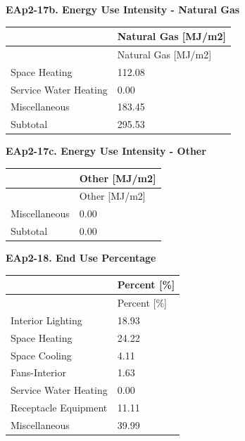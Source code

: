 \textbf{EAp2-17b. Energy Use Intensity - Natural Gas}

\begin{longtable}[c]{@{}ll@{}}
\toprule
 & Natural Gas [MJ/m2] \tabularnewline
\midrule
\endfirsthead

\toprule
 & Natural Gas [MJ/m2] \tabularnewline
\midrule
\endhead

Space Heating & 112.08 \tabularnewline
Service Water Heating & 0.00 \tabularnewline
Miscellaneous & 183.45 \tabularnewline
Subtotal & 295.53 \tabularnewline
\bottomrule
\end{longtable}

\textbf{EAp2-17c. Energy Use Intensity - Other}

\begin{longtable}[c]{@{}ll@{}}
\toprule
 & Other [MJ/m2] \tabularnewline
\midrule
\endfirsthead

\toprule
 & Other [MJ/m2] \tabularnewline
\midrule
\endhead

Miscellaneous & 0.00 \tabularnewline
Subtotal & 0.00 \tabularnewline
\bottomrule
\end{longtable}

\textbf{EAp2-18. End Use Percentage}

\begin{longtable}[c]{@{}ll@{}}
\toprule
 & Percent [\%] \tabularnewline
\midrule
\endfirsthead

\toprule
 & Percent [\%] \tabularnewline
\midrule
\endhead

Interior Lighting & 18.93 \tabularnewline
Space Heating & 24.22 \tabularnewline
Space Cooling & 4.11 \tabularnewline
Fans-Interior & 1.63 \tabularnewline
Service Water Heating & 0.00 \tabularnewline
Receptacle Equipment & 11.11 \tabularnewline
Miscellaneous & 39.99 \tabularnewline
\bottomrule
\end{longtable}


